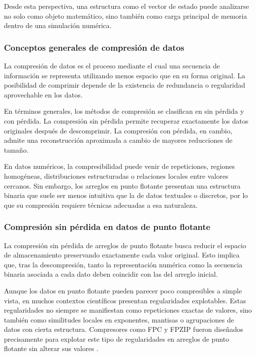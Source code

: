Desde esta perspectiva, una estructura como el vector de estado puede analizarse no solo como objeto matemático, sino también como carga principal de memoria dentro de una simulación numérica.

\subsubsection{Conceptos generales de compresión de datos}

La compresión de datos es el proceso mediante el cual una secuencia de información se representa utilizando menos espacio que en su forma original. La posibilidad de comprimir depende de la existencia de redundancia o regularidad aprovechable en los datos.

En términos generales, los métodos de compresión se clasifican en sin pérdida y con pérdida. La compresión sin pérdida permite recuperar exactamente los datos originales después de descomprimir. La compresión con pérdida, en cambio, admite una reconstrucción aproximada a cambio de mayores reducciones de tamaño.

En datos numéricos, la compresibilidad puede venir de repeticiones, regiones homogéneas, distribuciones estructuradas o relaciones locales entre valores cercanos. Sin embargo, los arreglos en punto flotante presentan una estructura binaria que suele ser menos intuitiva que la de datos textuales o discretos, por lo que su compresión requiere técnicas adecuadas a esa naturaleza.

\subsubsection{Compresión sin pérdida en datos de punto flotante}

La compresión sin pérdida de arreglos de punto flotante busca reducir el espacio de almacenamiento preservando exactamente cada valor original. Esto implica que, tras la descompresión, tanto la representación numérica como la secuencia binaria asociada a cada dato deben coincidir con las del arreglo inicial.

Aunque los datos en punto flotante pueden parecer poco compresibles a simple vista, en muchos contextos científicos presentan regularidades explotables. Estas regularidades no siempre se manifiestan como repeticiones exactas de valores, sino también como similitudes locales en exponentes, mantisas o agrupaciones de datos con cierta estructura. Compresores como FPC y FPZIP fueron diseñados precisamente para explotar este tipo de regularidades en arreglos de punto flotante sin alterar sus valores \cite{burtscher2009fpc,lindstrom2006fpzip}.

